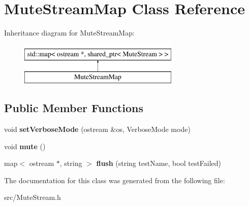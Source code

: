 \hypertarget{class_mute_stream_map}{\section{Mute\-Stream\-Map Class Reference}
\label{class_mute_stream_map}
}
Inheritance diagram for Mute\-Stream\-Map\-:\begin{figure}[H]
\begin{center}
\leavevmode
\includegraphics[height=2.000000cm]{class_mute_stream_map}
\end{center}
\end{figure}
\subsection*{Public Member Functions}
\begin{DoxyCompactItemize}
\item 
\hypertarget{class_mute_stream_map_a4d925b2736c0e5ec37ec2ebe9589b5ed}{void {\bfseries set\-Verbose\-Mode} (ostream \&os, Verbose\-Mode mode)}\label{class_mute_stream_map_a4d925b2736c0e5ec37ec2ebe9589b5ed}

\item 
\hypertarget{class_mute_stream_map_a15ee41dfcce256338228b59fe2bf4805}{void {\bfseries mute} ()}\label{class_mute_stream_map_a15ee41dfcce256338228b59fe2bf4805}

\item 
\hypertarget{class_mute_stream_map_ab22d4b4b899a3a89ecf0fc9b3fed5712}{map$<$ ostream $\ast$, string $>$ {\bfseries flush} (string test\-Name, bool test\-Failed)}\label{class_mute_stream_map_ab22d4b4b899a3a89ecf0fc9b3fed5712}

\end{DoxyCompactItemize}


The documentation for this class was generated from the following file\-:\begin{DoxyCompactItemize}
\item 
src/Mute\-Stream.\-h\end{DoxyCompactItemize}
